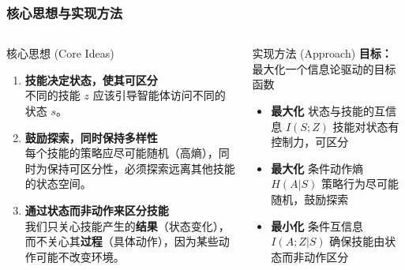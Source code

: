 \documentclass{beamer}
\begin{document}
\begin{frame}
    \tiny
    \frametitle{核心思想与实现方法}
    \begin{columns}[T]
        \begin{column}{0.6\textwidth}
            \begin{block}{核心思想 (Core Ideas)}
                \begin{enumerate}
                    \item \textbf{技能决定状态，使其可区分} \\
                    不同的技能 $z$ 应该引导智能体访问不同的状态 $s$。
                    \vspace{0.2cm}
                    
                    \item \textbf{鼓励探索，同时保持多样性} \\
                    每个技能的策略应尽可能随机（高熵），同时为保持可区分性，必须探索远离其他技能的状态空间。
                    \vspace{0.2cm}
                    
                    \item \textbf{通过状态而非动作来区分技能} \\
                    我们只关心技能产生的\textbf{结果}（状态变化），而不关心其\textbf{过程}（具体动作），因为某些动作可能不改变环境。
                \end{enumerate}
            \end{block}
        \end{column}

         \begin{column}{0.4\textwidth}
            \tiny
            \begin{block}{实现方法 (Approach)}
                \textbf{目标：} 最大化一个信息论驱动的目标函数
                \begin{itemize}
                    \item \textbf{最大化} 状态与技能的互信息 $I(S; Z)$ 
                     技能对状态有控制力，可区分
                    \vspace{0.2cm}
                    
                    \item \textbf{最大化} 条件动作熵 $H(A|S)$ 
                      策略行为尽可能随机，鼓励探索
                    \vspace{0.2cm}
                    
                    \item \textbf{最小化} 条件互信息 $I(A; Z | S)$ 
                     确保技能由状态而非动作区分
                \end{itemize}
            \end{block}
        \end{column}
    \end{columns}


\end{frame}
\end{document}
